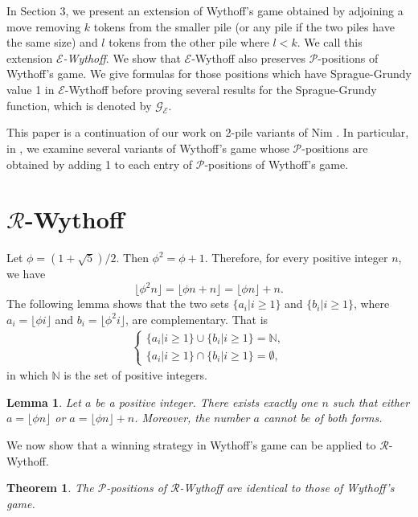 \documentclass[12pt]{amsart}
\theoremstyle{plain}
\newtheorem{lemma}[proposition]{Lemma}
\newtheorem{theorem}[proposition]{Theorem}
\theoremstyle{definition}
\theoremstyle{remark}
\begin{document}
In Section 3, we present an extension of Wythoff's game obtained by adjoining a move removing $k$ tokens from the smaller pile (or any pile if the two piles have the same size) and $l$ tokens from the other pile where $l < k$. We call this extension  \emph{${\mathcal{E}}$-Wythoff}. We show that ${\mathcal{E}}$-Wythoff  also preserves ${\mathcal{P}}$-positions of Wythoff's game. We give formulas for those positions which have Sprague-Grundy value 1 in ${\mathcal{E}}$-Wythoff before proving several results for the Sprague-Grundy function, which is denoted by ${\mathcal{G}}_{\mathcal{E}}$.

This paper is a continuation of our work on 2-pile variants of Nim \cite{MEuclid, Min, CHL, Ho}. In particular, in \cite{Ho}, we examine several variants of Wythoff's game whose ${\mathcal{P}}$-positions are obtained by adding 1 to each entry of ${\mathcal{P}}$-positions of Wythoff's game.

\medskip

\section{${\mathcal{R}}$-Wythoff}

Let $\phi = (1+\sqrt{5})/2$. Then $\phi^2 = \phi + 1$. Therefore, for every positive integer $n$, we have
\[\lfloor \phi^2n \rfloor = \lfloor \phi n + n \rfloor = \lfloor \phi n \rfloor + n.\]
The following lemma shows that the two sets $\{a_i | i \geq 1\}$ and $\{b_i | i \geq 1\}$, where $a_i = \lfloor \phi i \rfloor$ and $b_i = \lfloor \phi^2 i \rfloor$, are complementary. That is
\begin{align*}
\begin{cases}
\{a_i | i \geq 1\} \cup \{b_i | i \geq 1\} = {\mathbb{N}},\\
\{a_i | i \geq 1\} \cap \{b_i | i \geq 1\} = \emptyset,
\end{cases}
\end{align*}
in which ${\mathbb{N}}$ is the set of positive integers.

\smallskip
\begin{lemma} \label{Comp} \cite{beatty1}
Let $a$ be a positive integer. There exists exactly one $n$ such that either $a = \lfloor \phi n \rfloor$ or $a = \lfloor \phi n \rfloor + n$. Moreover, the number $a$ cannot be of both forms.
\end{lemma}

We now show that a winning strategy in Wythoff's game can be applied to ${\mathcal{R}}$-Wythoff.
\smallskip
\begin{theorem} \label{BW-P}
The ${\mathcal{P}}$-positions of ${\mathcal{R}}$-Wythoff  are identical to those of Wythoff's game.
\end{theorem}
\end{document}
